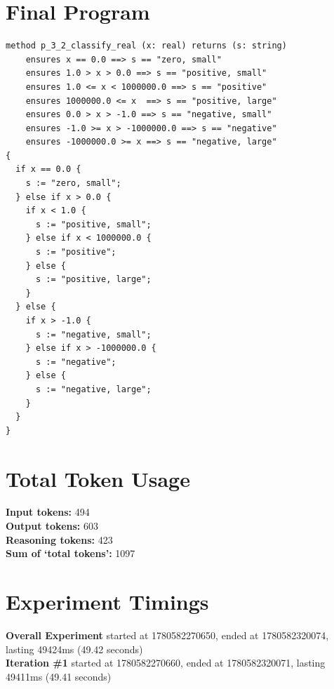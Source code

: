 \documentclass{article}
\begin{document}
\section*{Final Program}
\begin{lstlisting}
method p_3_2_classify_real (x: real) returns (s: string)
	ensures x == 0.0 ==> s == "zero, small"
	ensures 1.0 > x > 0.0 ==> s == "positive, small"
	ensures 1.0 <= x < 1000000.0 ==> s == "positive"
	ensures 1000000.0 <= x  ==> s == "positive, large"
	ensures 0.0 > x > -1.0 ==> s == "negative, small"
	ensures -1.0 >= x > -1000000.0 ==> s == "negative"
	ensures -1000000.0 >= x ==> s == "negative, large"
{
  if x == 0.0 {
    s := "zero, small";
  } else if x > 0.0 {
    if x < 1.0 {
      s := "positive, small";
    } else if x < 1000000.0 {
      s := "positive";
    } else {
      s := "positive, large";
    }
  } else {
    if x > -1.0 {
      s := "negative, small";
    } else if x > -1000000.0 {
      s := "negative";
    } else {
      s := "negative, large";
    }
  }
}
\end{lstlisting}
\section*{Total Token Usage}
\textbf{Input tokens: }494
\\\textbf{Output tokens: }603
\\\textbf{Reasoning tokens: }423
\\\textbf{Sum of `total tokens': }1097
\section*{Experiment Timings}
\textbf{Overall Experiment} started at 1780582270650, ended at 1780582320074, lasting 49424ms (49.42 seconds)
\\\textbf{Iteration \#1} started at 1780582270660, ended at 1780582320071, lasting 49411ms (49.41 seconds)
\end{document}

